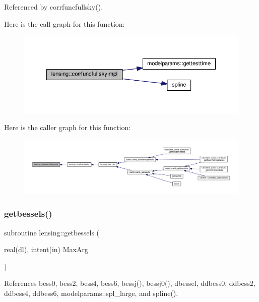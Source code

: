 Referenced by corrfuncfullsky().

Here is the call graph for this function\+:
\nopagebreak
\begin{figure}[H]
\begin{center}
\leavevmode
\includegraphics[width=350pt]{namespacelensing_ae3afbc47d14796e30a26538f38a726dd_cgraph}
\end{center}
\end{figure}
Here is the caller graph for this function\+:
\nopagebreak
\begin{figure}[H]
\begin{center}
\leavevmode
\includegraphics[width=350pt]{namespacelensing_ae3afbc47d14796e30a26538f38a726dd_icgraph}
\end{center}
\end{figure}
\mbox{\label{namespacelensing_a208c6bffe402d39685fb2f4509de310c}} 
\subsubsection{\texorpdfstring{getbessels()}{getbessels()}}
{\footnotesize\ttfamily subroutine lensing\+::getbessels (\begin{DoxyParamCaption}\item[{real(dl), intent(in)}]{Max\+Arg }\end{DoxyParamCaption})}



References bess0, bess2, bess4, bess6, bessj(), bessj0(), dbessel, ddbess0, ddbess2, ddbess4, ddbess6, modelparams\+::spl\+\_\+large, and spline().



